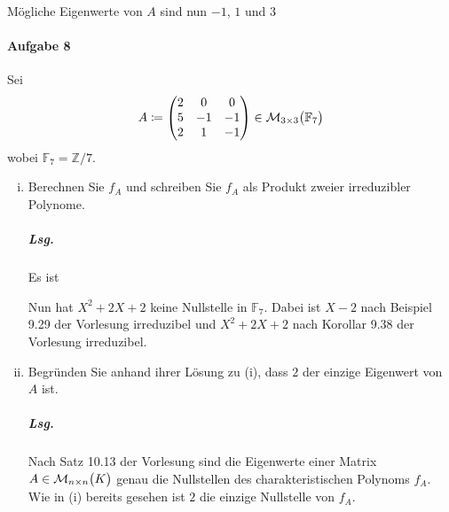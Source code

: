 \documentclass{scrreprt}
\begin{document}
Mögliche Eigenwerte von $A$ sind nun $-1$, $1$ und $3$

\newpage
\paragraph{Aufgabe 8} Sei
\[
  A \coloneqq \begin{pmatrix}
    2 & 0 & 0 \\
    5 & -1 & -1 \\
    2 & 1 & -1 \\
  \end{pmatrix} \in \mathcal{M}_{3 \times 3}\qty\big(\mathbb{F}_7)
\]
wobei $\mathbb{F}_7 = \mathbb{Z}/7$.
\begin{enumerate}[(i)]
\item Berechnen Sie $f_A$ und schreiben Sie $f_A$ als Produkt zweier
  irreduzibler Polynome.

  \subparagraph{Lsg.} Es ist
  Nun hat $X^2 + 2X + 2$ keine Nullstelle in $\mathbb{F}_7$.
  Dabei ist $X - 2$ nach Beispiel 9.29 der Vorlesung irreduzibel
  und $X^2 + 2X + 2$ nach Korollar 9.38 der Vorlesung irreduzibel.

\item Begründen Sie anhand ihrer Lösung zu (i), dass $2$ der einzige
  Eigenwert von $A$ ist.

  \subparagraph{Lsg.} Nach Satz 10.13 der Vorlesung sind die Eigenwerte einer
  Matrix $A \in \mathcal{M}_{n \times n}\qty\big(K)$ genau die Nullstellen des
  charakteristischen Polynoms $f_A$.
  Wie in (i) bereits gesehen ist $2$ die einzige Nullstelle von $f_A$.


\end{enumerate}
\end{document}
